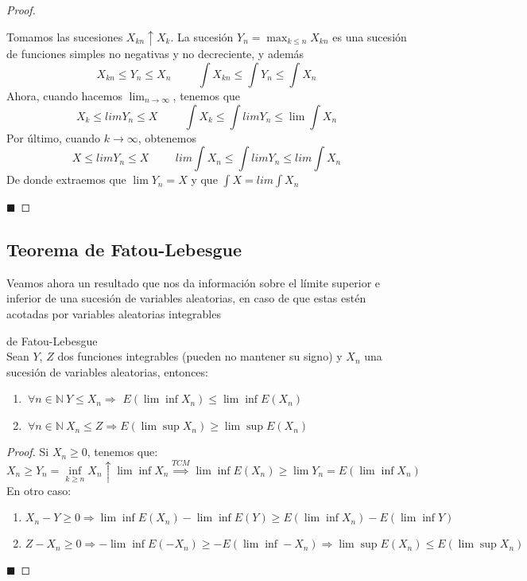 \documentclass[12pt,a4paper]{book}
\newcommand*{\qed}{\hfill\ensuremath{\blacksquare}}
\begin{document}
\begin{proof}
\

Tomamos las sucesiones $X_{kn} \uparrow X_k$. La sucesión $Y_n = \displaystyle \max_{k \leq n} X_{kn}$ es una sucesión de funciones simples no negativas y no decreciente, y además
$$X_{kn} \leq Y_n \leq X_n 
\hspace{1cm}
\int X_{kn} \leq \int Y_n \leq \int X_n$$
Ahora, cuando hacemos $\lim_{n \rightarrow \infty}$, tenemos que
$$X_k \leq lim Y_n \leq X 
\hspace{1cm}
\int X_k \leq \int lim Y_n \leq \lim \int X_n$$
Por último, cuando $k \rightarrow \infty$, obtenemos
$$X \leq lim Y_n \leq X 
\hspace{1cm}
lim \int X_n \leq \int lim Y_n \leq lim \int X_n$$
De donde extraemos que $\lim Y_n = X$ y que $\displaystyle \int X = lim \int X_n$

\qed
\end{proof}

\subsection{Teorema de Fatou-Lebesgue}
Veamos ahora un resultado que nos da información sobre el límite superior e inferior de una sucesión de variables aleatorias, en caso de que estas estén acotadas por variables aleatorias integrables

\begin{theorem}
de Fatou-Lebesgue\\

Sean $Y$, $Z$ dos funciones integrables (pueden no mantener su signo) y $X_n$ una sucesión de variables aleatorias, entonces:
\begin{enumerate}
\item $\ \forall n\in\mathbb{N} \ Y \leq X_n \Longrightarrow$ $E(\lim \inf X_n) \leq \lim \inf E(X_n)$
\item $\ \forall n\in\mathbb{N}\ X_n \leq Z \Longrightarrow E(\lim \sup X_n)\geq \lim \sup E(X_n)$
\end{enumerate}
\end{theorem}

\begin{proof}
Si $X_n \geq 0$, tenemos que:
$$ X_n \geq Y_n = \inf_{k \geq n} X_n \uparrow \lim \inf X_n \stackrel{TCM}{\implies} \lim \inf E(X_n) \geq \lim Y_n = E(\lim \inf X_n)$$
En otro caso:
\begin{enumerate}
\item $X_n - Y \geq 0 \Rightarrow \lim \inf E(X_n) - \lim \inf E(Y) \geq E(\lim \inf X_n) - E(\lim \inf Y)$
\item $Z - X_n \geq 0 \Rightarrow - \lim \inf E(-X_n) \geq - E(\lim \inf - X_n) \Rightarrow \lim \sup E(X_n) \leq E(\lim \sup X_n)$
\end{enumerate}
\qed
\end{proof}
\end{document}
